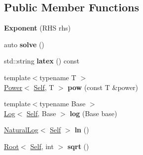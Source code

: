 \subsection*{Public Member Functions}
\begin{DoxyCompactItemize}
\item 
\hypertarget{classlatex_1_1math_1_1Exponent_ab8293dec900c3e88a172436bbafb16d4}{{\bfseries Exponent} (R\-H\-S rhs)}\label{classlatex_1_1math_1_1Exponent_ab8293dec900c3e88a172436bbafb16d4}

\item 
\hypertarget{classlatex_1_1math_1_1Exponent_ac6bc11900331049296afd1cf190ab759}{auto {\bfseries solve} ()}\label{classlatex_1_1math_1_1Exponent_ac6bc11900331049296afd1cf190ab759}

\item 
\hypertarget{classlatex_1_1math_1_1Exponent_a6db4173ded8207b9b77049c594eb49dc}{std\-::string {\bfseries latex} () const }\label{classlatex_1_1math_1_1Exponent_a6db4173ded8207b9b77049c594eb49dc}

\item 
\hypertarget{classlatex_1_1math_1_1Exponent_a8220d1ffafdf8eeefd502488fa91606f}{{\footnotesize template$<$typename T $>$ }\\\hyperlink{classlatex_1_1math_1_1Power}{Power}$<$ \hyperlink{classlatex_1_1math_1_1Exponent}{Self}, T $>$ {\bfseries pow} (const T \&power)}\label{classlatex_1_1math_1_1Exponent_a8220d1ffafdf8eeefd502488fa91606f}

\item 
\hypertarget{classlatex_1_1math_1_1Exponent_ac68c345fbf1a3dcd6cf58673e052ebd9}{{\footnotesize template$<$typename Base $>$ }\\\hyperlink{classlatex_1_1math_1_1Log}{Log}$<$ \hyperlink{classlatex_1_1math_1_1Exponent}{Self}, Base $>$ {\bfseries log} (Base base)}\label{classlatex_1_1math_1_1Exponent_ac68c345fbf1a3dcd6cf58673e052ebd9}

\item 
\hypertarget{classlatex_1_1math_1_1Exponent_ac91297ba0e04c868e27b22e19db84002}{\hyperlink{classlatex_1_1math_1_1NaturalLog}{Natural\-Log}$<$ \hyperlink{classlatex_1_1math_1_1Exponent}{Self} $>$ {\bfseries ln} ()}\label{classlatex_1_1math_1_1Exponent_ac91297ba0e04c868e27b22e19db84002}

\item 
\hypertarget{classlatex_1_1math_1_1Exponent_a06e7e698f6747c1a38a80e0ecf5bee0b}{\hyperlink{classlatex_1_1math_1_1Root}{Root}$<$ \hyperlink{classlatex_1_1math_1_1Exponent}{Self}, int $>$ {\bfseries sqrt} ()}\label{classlatex_1_1math_1_1Exponent_a06e7e698f6747c1a38a80e0ecf5bee0b}

\end{DoxyCompactItemize}
